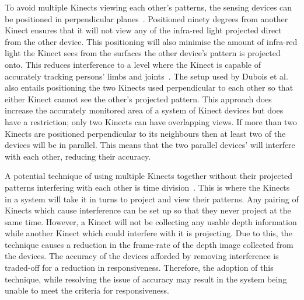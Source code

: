 \documentclass[link]{IWCOMP}
\begin{document}
To avoid multiple Kinects viewing each other's patterns, the sensing devices can be positioned in perpendicular planes~\citep{Caon2011,Kramer2012}.
Positioned ninety degrees from another Kinect ensures that it will not view any of the infra-red light projected direct from the other device.
This positioning will also minimise the amount of infra-red light the Kinect sees from the surfaces the other device's pattern is projected onto.
This reduces interference to a level where the Kinect is capable of accurately tracking persons' limbs and joints~\citep{Caon2011}.
The setup used by Dubois et al.~\citep{Dubois2011} also entails positioning the two Kinects used perpendicular to each other so that either Kinect cannot see the other's projected pattern.
This approach does increase the accurately monitored area of a system of Kinect devices but does have a restriction; only two Kinects can have overlapping views.
If more than two Kinects are positioned perpendicular to its neighbours then at least two of the devices will be in parallel.
This means that the two parallel devices' will interfere with each other, reducing their accuracy.

A potential technique of using multiple Kinects together without their projected patterns interfering with each other is time division~\citep{Schroder2011}.
This is where the Kinects in a system will take it in turns to project and view their patterns.
Any pairing of Kinects which cause interference can be set up so that they never project at the same time.
However, a Kinect will not be collecting any usable depth information while another Kinect which could interfere with it is projecting.
Due to this,  the technique causes a reduction in the frame-rate of the depth image collected from the devices.
The accuracy of the devices afforded by removing interference is traded-off for a reduction in responsiveness.
Therefore, the adoption of this technique, while resolving the issue of accuracy may result in the system being unable to meet the criteria for responsiveness.
\end{document}
